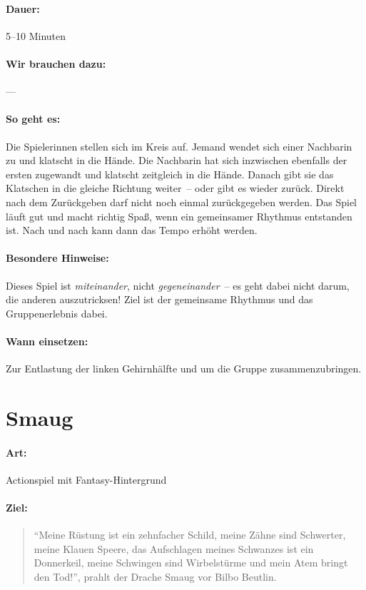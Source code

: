 \paragraph{Dauer:} 5--10 Minuten
\paragraph{Wir brauchen dazu:} ---
\paragraph{So geht es:} Die Spielerinnen stellen sich im Kreis auf. Jemand wendet sich einer Nachbarin zu und klatscht in die Hände. Die Nachbarin hat sich inzwischen ebenfalls der ersten zugewandt und klatscht zeitgleich in die Hände. Danach gibt sie das Klatschen in die gleiche Richtung weiter~-- oder gibt es wieder zurück. Direkt nach dem Zurückgeben darf nicht noch einmal zurückgegeben werden. Das Spiel läuft gut und macht richtig Spaß, wenn ein gemeinsamer Rhythmus entstanden ist. Nach und nach kann dann das Tempo erhöht werden.
\paragraph{Besondere Hinweise:} Dieses Spiel ist \emph{miteinander}, nicht \emph{gegeneinander}~-- es geht dabei nicht darum, die anderen auszutricksen! Ziel ist der gemeinsame Rhythmus und das Gruppenerlebnis dabei.
\paragraph{Wann einsetzen:} Zur Entlastung der linken Gehirnhälfte und um die Gruppe zusammenzubringen.

\section{Smaug}
\paragraph{Art:} Actionspiel mit Fantasy-Hintergrund
\paragraph{Ziel:}
\begin{quote}
	"`Meine Rüstung ist ein zehnfacher Schild, meine Zähne sind Schwerter, meine Klauen Speere, das Aufschlagen meines Schwanzes ist ein Donnerkeil, meine Schwingen sind Wirbelstürme und mein Atem bringt den Tod!"', prahlt der Drache Smaug vor Bilbo Beutlin.
\end{quote}

